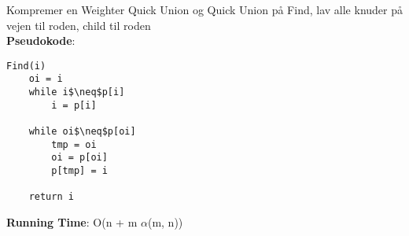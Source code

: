 Kompremer en Weighter Quick Union og Quick Union på Find, lav alle knuder på vejen til roden, child til roden\\
\textbf{Pseudokode}:
\begin{lstlisting}[frame=single, mathescape=true]
Find(i)
	oi = i
	while i$\neq$p[i]
		i = p[i]

	while oi$\neq$p[oi]
		tmp = oi
		oi = p[oi]
		p[tmp] = i

	return i
\end{lstlisting}
\textbf{Running Time}: O(n + m $\alpha$(m, n))